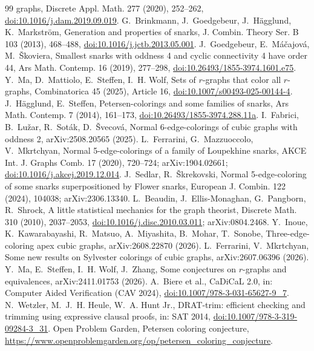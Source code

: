 \documentclass[11pt]{article}
\theoremstyle{definition}
\theoremstyle{remark}
\begin{document}
\begin{thebibliography}{99}
graphs, Discrete Appl. Math. 277 (2020), 252--262,
\href{https://doi.org/10.1016/j.dam.2019.09.019}{doi:10.1016/j.dam.2019.09.019}.
 G.~Brinkmann, J.~Goedgebeur, J.~H\"agglund, K.~Markstr\"om, Generation and
properties of snarks, J. Combin. Theory Ser. B 103 (2013), 468--488,
\href{https://doi.org/10.1016/j.jctb.2013.05.001}{doi:10.1016/j.jctb.2013.05.001}.
 J.~Goedgebeur, E.~M\'a\v{c}ajov\'a, M.~\v{S}koviera, Smallest snarks with oddness
4 and cyclic connectivity 4 have order 44, Ars Math. Contemp. 16 (2019), 277--298,
\href{https://doi.org/10.26493/1855-3974.1601.e75}{doi:10.26493/1855-3974.1601.e75}.
 Y.~Ma, D.~Mattiolo, E.~Steffen, I.~H. Wolf, Sets of $r$-graphs that color all
$r$-graphs, Combinatorica 45 (2025), Article 16,
\href{https://doi.org/10.1007/s00493-025-00144-4}{doi:10.1007/s00493-025-00144-4}.
 J.~H\"agglund, E.~Steffen, Petersen-colorings and some families of snarks, Ars Math.
Contemp. 7 (2014), 161--173, \href{https://doi.org/10.26493/1855-3974.288.11a}{doi:10.26493/1855-3974.288.11a}.
 I.~Fabrici, B.~Lu\v{z}ar, R.~Sot\'ak, D.~\v{S}vecov\'a, Normal 6-edge-colorings of
cubic graphs with oddness 2, arXiv:2508.20565 (2025).
 L.~Ferrarini, G.~Mazzuoccolo, V.~Mkrtchyan, Normal 5-edge-colorings of a family
of Loupekhine snarks, AKCE Int. J. Graphs Comb. 17 (2020), 720--724; arXiv:1904.02661;
\href{https://doi.org/10.1016/j.akcej.2019.12.014}{doi:10.1016/j.akcej.2019.12.014}.
 J.~Sedlar, R.~\v{S}krekovski, Normal 5-edge-coloring of some snarks superpositioned
by Flower snarks, European J. Combin. 122 (2024), 104038; arXiv:2306.13340.
 L.~Beaudin, J.~Ellis-Monaghan, G.~Pangborn, R.~Shrock, A little statistical
mechanics for the graph theorist, Discrete Math. 310 (2010), 2037--2053,
\href{https://doi.org/10.1016/j.disc.2010.03.011}{doi:10.1016/j.disc.2010.03.011}; arXiv:0804.2468.
 Y.~Inoue, K.~Kawarabayashi, R.~Matsuo, A.~Miyashita, B.~Mohar, T.~Sonobe,
Three-edge-coloring apex cubic graphs, arXiv:2608.22870 (2026).
 L.~Ferrarini, V.~Mkrtchyan, Some new results on Sylvester colorings of cubic graphs,
arXiv:2607.06396 (2026).
 Y.~Ma, E.~Steffen, I.~H. Wolf, J.~Zhang, Some conjectures on $r$-graphs and
equivalences, arXiv:2411.01753 (2026).
 A.~Biere et al., CaDiCaL 2.0, in: Computer Aided Verification (CAV 2024),
\href{https://doi.org/10.1007/978-3-031-65627-9_7}{doi:10.1007/978-3-031-65627-9\_7}.
 N.~Wetzler, M.~J.~H. Heule, W.~A. Hunt Jr., DRAT-trim: efficient checking and
trimming using expressive clausal proofs, in: SAT 2014,
\href{https://doi.org/10.1007/978-3-319-09284-3_31}{doi:10.1007/978-3-319-09284-3\_31}.
 Open Problem Garden, Petersen coloring conjecture,
\url{https://www.openproblemgarden.org/op/petersen_coloring_conjecture}.
\end{thebibliography}
\end{document}
